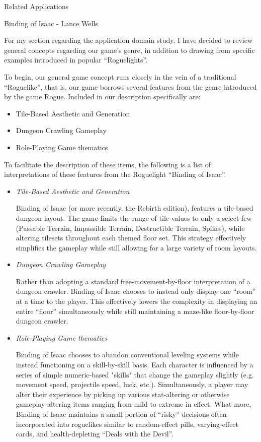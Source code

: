 \documentclass[12pt]{report}
\begin{document}
\begin{section}{Related Applications}
\begin{subsection}{Binding of Isaac - Lance Wells}

For my section regarding the application domain study, I have decided to
review general concepts regarding our game's genre, in addition to drawing
from specific examples introduced in popular ``Roguelights''.

To begin, our general game concept runs closely in the vein of a
traditional ``Roguelike'', that is, our game borrows several features from
the genre introduced by the game Rogue. Included in our description
specifically are:

\begin{itemize}
\item Tile-Based Aesthetic and Generation
\item Dungeon Crawling Gameplay
\item Role-Playing Game thematics
\end{itemize}

To facilitate the description of these items, the following is a list of
interpretations of these features from the Roguelight ``Binding of Isaac''.

\begin{itemize}
\item \emph{Tile-Based Aesthetic and Generation}

Binding of Isaac (or more recently, the Rebirth edition), features a
tile-based dungeon layout. The game limits the range of tile-values to only
a select few (Passable Terrain, Impassible Terrain, Destructible Terrain,
Spikes), while altering tilesets throughout each themed floor set. This
strategy effectively simplifies the gameplay while still allowing for a
large variety of room layouts.

\item	\emph{Dungeon Crawling Gameplay}

Rather than adopting a standard free-movement-by-floor interpretation of a
dungeon crawler. Binding of Isaac chooses to instead only display one
``room'' at a time to the player. This effectively lowers the complexity in
displaying an entire ``floor'' simultaneously while still maintaining a
maze-like floor-by-floor dungeon crawler.

\item	\emph{Role-Playing Game thematics}

Binding of Isaac chooses to abandon conventional leveling systems while
instead functioning on a skill-by-skill basis. Each character is influenced
by a series of simple numeric-based "skills" that change the gameplay
slightly (e.g. movement speed, projectile speed, luck, etc.).
Simultaneously, a player may alter their experience by picking up various
stat-altering or otherwise gameplay-altering items ranging from mild to
extreme in effect. What more, Binding of Isaac maintains a small portion of
``risky'' decisions often incorporated into roguelikes similar to
random-effect pills, varying-effect  cards, and health-depleting ``Deals
with the Devil''.
\end{itemize}
\end{subsection}


\end{section}
\end{document}
